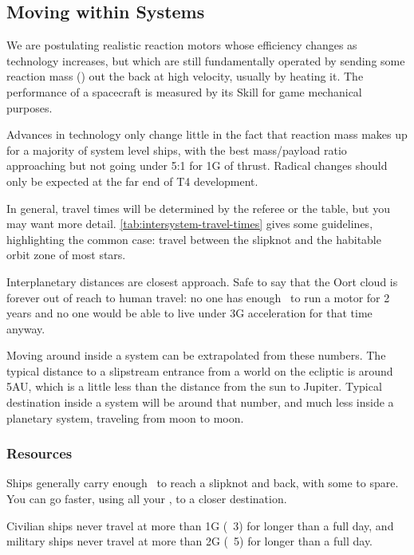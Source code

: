 \subsection{Moving within Systems}
\label{sec:moving-within-systems}



We are postulating realistic reaction motors whose efficiency changes as technology increases, but which are still fundamentally operated by sending some reaction mass (\RMass) out the back at high velocity, usually by heating it. The performance of a spacecraft is measured by its  Skill for game mechanical purposes.

Advances in technology only change little in the fact that reaction mass makes up for a majority of system level ships, with the best mass/payload ratio approaching but not going under 5:1 for 1G of thrust. Radical changes should only be expected at the far end of T4 development.

In general, travel times will be determined by the referee or the table, but you may want more detail.  \autoref{tab:intersystem-travel-times} gives some guidelines, highlighting the common case: travel between the slipknot and the habitable orbit zone of most stars.

Interplanetary distances are closest approach. Safe to say that the Oort cloud is forever out of reach to human travel: no one has enough \RMass\ to run a motor for 2 years and no one would be able to live under 3G acceleration for that time anyway.

Moving around inside a system can be extrapolated from these numbers. The typical distance to a slipstream entrance from a world on the ecliptic is around 5AU, which is a little less than the distance from the sun to Jupiter. Typical destination inside a system will be around that number, and much less inside a planetary system, traveling from moon to moon.

\subsubsection{Resources}

Ships generally carry enough \RMass\ to reach a slipknot and back, with some to spare. You can go faster, using all your \RMass, to a closer destination.

Civilian ships never travel at more than 1G (\Vshift\ 3) for longer than a full day, and military ships never travel at more than 2G (\Vshift\ 5) for longer than a full day.

